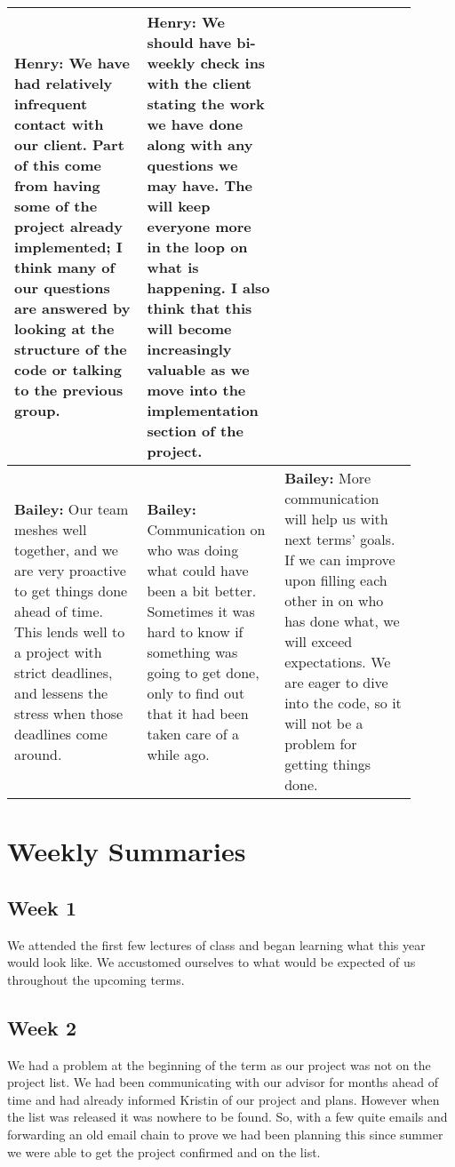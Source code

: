 \documentclass[draftclsnofoot,onecolumn,journal,letterpaper,compsoc,10pt]{IEEEtran}
\begin{document}
\begin{center}
\begin{tabular}{|p{0.3\linewidth}|p{0.3\linewidth}|p{0.3\linewidth}|}
            {\bf Henry:}\newline
                We have had relatively infrequent contact with our client. Part of this come from having some of the project already implemented; I think many of our questions are answered by looking at the structure of the code or talking to the previous group. &
            {\bf Henry:}\newline
                We should have bi-weekly check ins with the client stating the work we have done along with any questions we may have. The will keep everyone more in the loop on what is happening. I also think that this will become increasingly valuable as we move into the implementation section of the project. \\
        \hline
            {\bf Bailey:}\newline
            Our team meshes well together, and we are very proactive to get things done ahead of time. This lends well to a project with strict deadlines, and lessens the stress when those deadlines come around. &
            {\bf Bailey:}\newline
            Communication on who was doing what could have been a bit better. Sometimes it was hard to know if something was going to get done, only to find out that it had been taken care of a while ago. &
            {\bf Bailey:}\newline
            More communication will help us with next terms' goals. If we can improve upon filling each other in on who has done what, we will exceed expectations. We are eager to dive into the code, so it will not be a problem for getting things done. \\
        \hline
    \end{tabular}
\end{center}

\section{Weekly Summaries}

    \subsection{Week 1}
    We attended the first few lectures of class and began learning what this year would look like.  We accustomed ourselves to what would be expected of us throughout the upcoming terms.

    \subsection{Week 2}
    We had a problem at the beginning of the term as our project was not on the project list.  We had been communicating with our advisor for months ahead of time and had already informed Kristin of our project and plans.  However when the list was released it was nowhere to be found.  So, with a few quite emails and forwarding an old email chain to prove we had been planning this since summer we were able to get the project confirmed and on the list.
    
\end{document}

